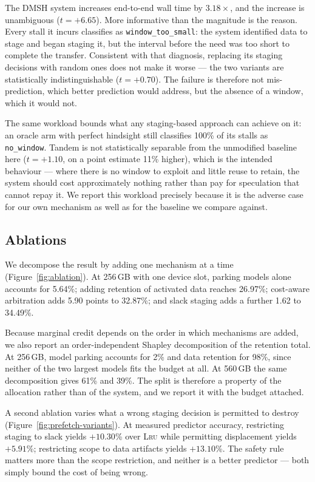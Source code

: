 \documentclass[10pt,twocolumn]{article}
\newcommand{\sysname}{Tandem\xspace}   %
\begin{document}
The DMSH system increases end-to-end wall time by $3.18\times$, and the
increase is unambiguous ($t = +6.65$). More informative than the magnitude is
the reason. Every stall it incurs classifies as \texttt{window\_too\_small}:
the system identified data to stage and began staging it, but the interval
before the need was too short to complete the transfer. Consistent with that
diagnosis, replacing its staging decisions with random ones does not make it
worse --- the two variants are statistically indistinguishable ($t = +0.70$).
The failure is therefore not mis-prediction, which better prediction would
address, but the absence of a window, which it would not.

The same workload bounds what any staging-based approach can achieve on it:
an oracle arm with perfect hindsight still classifies 100\% of its stalls as
\texttt{no\_window}. \sysname is not statistically separable from the
unmodified baseline here ($t = +1.10$, on a point estimate 11\% higher), which
is the intended behaviour --- where there is no window to exploit and little
reuse to retain, the system should cost approximately nothing rather than pay
for speculation that cannot repay it. We report this workload precisely
because it is the adverse case for our own mechanism as well as for the
baseline we compare against.

\subsection{Ablations}

We decompose the result by adding one mechanism at a time
(Figure~\ref{fig:ablation}). At 256\,GB with one device slot, parking models
alone accounts for 5.64\%; adding retention of activated data reaches
26.97\%; cost-aware arbitration adds 5.90 points to 32.87\%; and slack
staging adds a further 1.62 to 34.49\%.

Because marginal credit depends on the order in which mechanisms are added, we
also report an order-independent Shapley decomposition of the retention total.
At 256\,GB, model parking accounts for 2\% and data retention for 98\%, since
neither of the two largest models fits the budget at all. At 560\,GB the same
decomposition gives 61\% and 39\%. The split is therefore a property of the
allocation rather than of the system, and we report it with the budget
attached.

A second ablation varies what a wrong staging decision is permitted to destroy
(Figure~\ref{fig:prefetch-variants}). At measured predictor accuracy,
restricting staging to slack yields $+10.30$\% over \textsc{Lru} while
permitting displacement yields $+5.91$\%; restricting scope to data artifacts
yields $+13.10$\%. The safety rule matters more than the scope restriction,
and neither is a better predictor --- both simply bound the cost of being
wrong.
\end{document}
